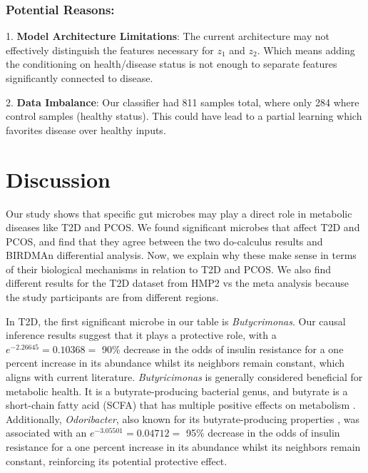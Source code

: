 \documentclass[12pt,letterpaper]{article}
\begin{document}
\subsubsection{Potential Reasons:}

1. \textbf{Model Architecture Limitations}: The current architecture may not effectively distinguish the features necessary for \( z_1 \) and \( z_2 \). Which means adding the conditioning on health/disease status is not enough to separate features significantly connected to disease.

2. \textbf{Data Imbalance}: Our classifier had 811 samples total, where only 284 where control samples (healthy status). This could have lead to a partial learning which favorites disease over healthy inputs.


\section{Discussion}

Our study shows that specific gut microbes may play a direct role in metabolic diseases like T2D and PCOS. We found significant microbes that affect T2D and PCOS, and find that they agree between the two do-calculus results and BIRDMAn differential analysis. Now, we explain why these make sense in terms of their biological mechanisms in relation to T2D and PCOS. We also find different results for the T2D dataset from HMP2 vs the meta analysis because the study participants are from different regions. 

In T2D, the first significant microbe in our table is \textit{Butycrimonas}. Our causal inference results suggest that it plays a protective role, with a $e^{-2.26645} = 0.10368 =$ 90\% decrease in the odds of insulin resistance for a one percent increase in its abundance whilst its neighbors remain constant, which aligns with current literature. \textit{Butyricimonas} is generally considered beneficial for metabolic health. It is a butyrate-producing bacterial genus, and butyrate is a short-chain fatty acid (SCFA) that has multiple positive effects on metabolism \citep{lee2022butyricimonas}. Additionally, \textit{Odoribacter}, also known for its butyrate-producing properties \citep{albataineh2023odoribacter}, was associated with an $e^{-3.05501} = 0.04712 =$ 95\% decrease in the odds of insulin resistance for a one percent increase in its abundance whilst its neighbors remain constant, reinforcing its potential protective effect.
\end{document}
